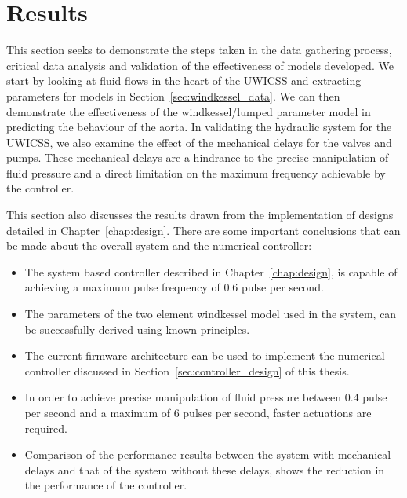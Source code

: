 \chapter{Results} 
\label{chap:results}
This section seeks to demonstrate the steps taken in the data gathering process, critical data analysis and validation of the effectiveness of models developed. We start by looking at fluid flows in the heart of the UWICSS and extracting parameters for models in Section~\ref{sec:windkessel_data}.  We can then demonstrate the effectiveness of the windkessel/lumped parameter model in predicting the behaviour of the aorta.  In validating the hydraulic system for the UWICSS, we also examine the effect of the mechanical delays for the valves and pumps.  These mechanical delays are a hindrance to the precise manipulation of fluid pressure and a direct limitation on the maximum frequency achievable by the controller.

This section also discusses the results drawn from the implementation of designs detailed in Chapter~\ref{chap:design}.  There are some important conclusions that can be made about the overall system and the numerical controller:
\begin{itemize}
\item The system based controller described in Chapter~\ref{chap:design}, is capable of achieving a maximum pulse frequency of 0.6 pulse per second.
\item The parameters of the two element windkessel model used in the system, can be successfully derived using known principles.
\item The current firmware architecture can be used to implement the numerical controller discussed in Section~\ref{sec:controller_design} of this thesis.
\item In order to achieve precise manipulation of fluid pressure between 0.4 pulse per second and a maximum of 6 pulses per second, faster actuations are required.
\item Comparison of the performance results between the system with mechanical delays and that of the system without these delays, shows the reduction in the performance of the controller.
\end{itemize}

